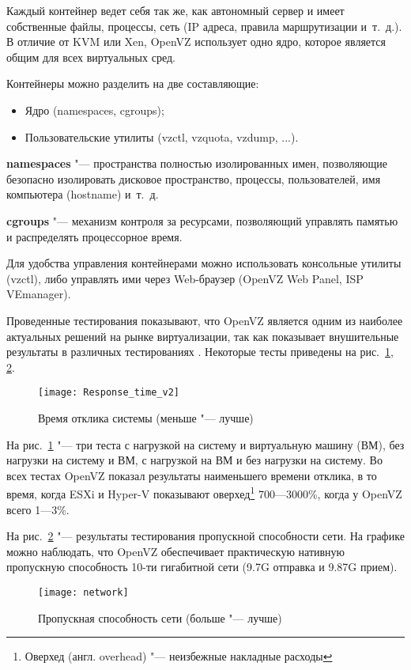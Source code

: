 Каждый контейнер ведет себя так же, как автономный сервер и имеет собственные файлы, процессы, сеть (IP адреса, правила маршрутизации и~т.~д.).
В отличие от KVM или Xen, OpenVZ использует одно ядро, которое является общим для всех виртуальных сред.

Контейнеры можно разделить на две составляющие:
\begin{itemize}
    \item Ядро (namespaces, cgroups);
    \item Пользовательские утилиты (vzctl, vzquota, vzdump, ...).
\end{itemize}
 
\textbf{namespaces} "--- пространства полностью изолированных имен, позволяющие безопасно изолировать дисковое пространство, процессы, пользователей, имя компьютера (hostname) и~т.~д.

\textbf{cgroups} "--- механизм контроля за ресурсами, позволяющий управлять памятью и распределять процессорное время.

Для удобства управления контейнерами можно использовать консольные утилиты (vzctl), либо управлять ими через Web-браузер (OpenVZ Web Panel, ISP VEmanager).

Проведенные тестирования показывают, что OpenVZ является одним из наиболее актуальных решений на рынке виртуализации, так как показывает внушительные результаты в различных тестированиях \cite{padala2007performance}.
Некоторые тесты \cite{openvzperformance} приведены на рис.~\ref{pic:openvz_test_1}, \ref{pic:openvz_test_2}.

\begin{figure}[ht]
    \centering
	\texttt{[image: Response\_time\_v2]}
	\caption{Время отклика системы (меньше "--- лучше)}\label{pic:openvz_test_1}
\end{figure}

На рис.~\ref{pic:openvz_test_1} "--- три теста с нагрузкой на систему и виртуальную машину (ВМ), без нагрузки на систему и ВМ, с нагрузкой на ВМ и без нагрузки на систему.
Во всех тестах OpenVZ показал результаты наименьшего времени отклика, в то время, когда ESXi и Hyper-V показывают оверхед\footnote{Оверхед (англ. overhead) "--- неизбежные накладные расходы} 700---3000\%, когда у OpenVZ всего 1---3\%.

На рис.~\ref{pic:openvz_test_2} "--- результаты тестирования пропускной способности сети.
На графике можно наблюдать, что OpenVZ обеспечивает практическую нативную пропускную способность 10-ти гигабитной сети (9.7G отправка и 9.87G прием).
\begin{figure}[ht]
    \centering
	\texttt{[image: network]}
	\caption{Пропускная способность сети (больше "--- лучше)}\label{pic:openvz_test_2}
\end{figure}

\clearpage
